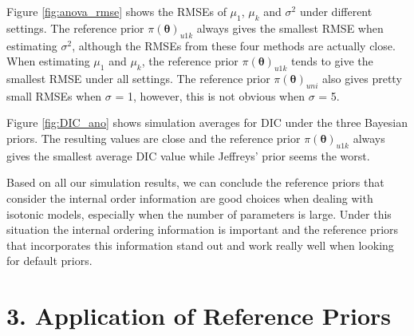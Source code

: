 \documentclass[Proceedings]{ascelike}
\begin{document}
Figure \ref{fig:anova_rmse} shows the RMSEs of $\mu_1$, $\mu_k$ and
$\sigma^2$ under different settings. The reference prior
$\pi(\pmb\theta)_{u1k}$ always gives the smallest RMSE when estimating
$\sigma^2$, although the RMSEs from these four methods are actually
close. When estimating $\mu_1$ and $\mu_k$, the reference prior
$\pi(\pmb\theta)_{u1k}$ tends to give the smallest RMSE under all
settings. The reference prior $\pi(\pmb\theta)_{uni}$ also gives
pretty small RMSEs when $\sigma$ = 1, however, this is not obvious
when $\sigma$ = 5.

Figure \ref{fig:DIC_ano} shows simulation averages for DIC under the
three Bayesian priors. The resulting values are close and the
reference prior $\pi(\pmb\theta)_{u1k}$ always gives the smallest
average DIC value while Jeffreys' prior seems the worst.

Based on all our simulation results, we can conclude the reference
priors that consider the internal order information are good choices
when dealing with isotonic models, especially when the number of
parameters is large. Under this situation the internal ordering
information is important and the reference priors that incorporates
this information stand out and work really well when looking for
default priors.
\section{3. Application of Reference Priors}
\end{document}
